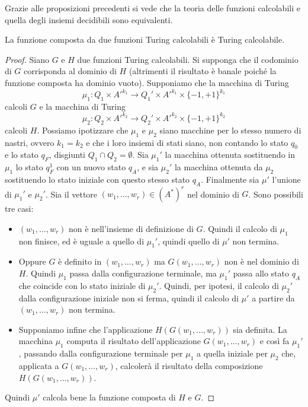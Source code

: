 Grazie alle proposizioni precedenti si vede che la teoria delle funzioni calcolabili e quella degli insiemi decidibili sono equivalenti.



\begin{prop}
La funzione composta da due funzioni Turing calcolabili è Turing calcolabile.
\end{prop}

\begin{proof}
Siano $G$ e $H$ due funzioni Turing calcolabili. Si supponga che il codominio di $G$ corrisponda al dominio di $H$ (altrimenti il risultato è banale poiché la funzione composta ha dominio vuoto). Supponiamo che la macchina di Turing
\[
\mu_1\colon Q_1\times A'^{k_1}\to Q_1'\times A'^{k_1}\times\{-1,+1\}^{k_1}
\]
calcoli $G$ e la macchina di Turing
\[
\mu_2\colon Q_2\times A'^{k_2}\to Q_2'\times A'^{k_2}\times\{-1,+1\}^{k_2}
\]
calcoli $H$. Possiamo ipotizzare che $\mu_1$ e $\mu_2$ siano macchine per lo stesso numero di nastri, ovvero $k_1=k_2$ e che i loro insiemi di stati siano, non contando lo stato $q_0$ e lo stato $q_F$, disgiunti $Q_1\cap Q_2=\emptyset$. Sia $\mu_1'$ la macchina ottenuta sostituendo in $\mu_1$ lo stato $q_F^1$ con un nuovo stato $q_A$, e sia $\mu_2'$ la macchina ottenuta da $\mu_2$ sostituendo lo stato iniziale con questo stesso stato $q_A$. Finalmente sia $\mu'$ l'unione di $\mu_1'$ e $\mu_2'$. Sia il vettore $(w_1,\dots,w_r)\in(A^*)^r$ nel dominio di $G$. Sono possibili tre casi:
\begin{itemize}
    \item $(w_1,\dots,w_r)$ non è nell'insieme di definizione di $G$. Quindi il calcolo di $\mu_1$ non finisce, ed è uguale a quello di $\mu_1'$, quindi quello di $\mu'$ non termina.
    \item Oppure $G$ è definito in $(w_1,\dots,w_r)$ ma $G(w_1,\dots,w_r)$ non è nel dominio di $H$. Quindi $\mu_1$ passa dalla configurazione terminale, ma $\mu_1'$ passa allo stato $q_A$ che coincide con lo stato iniziale di $\mu_2'$. Quindi, per ipotesi, il calcolo di $\mu_2'$ dalla configurazione iniziale non si ferma, quindi il calcolo di $\mu'$ a partire da $(w_1,\dots,w_r)$ non termina.
    \item Supponiamo infine che l'applicazione $H(G(w_1,\dots,w_r))$ sia definita. La macchina $\mu_1$ computa il risultato dell'applicazione $G(w_1,\dots,w_r)$ e così fa $\mu_1'$, passando dalla configurazione terminale per $\mu_1$ a quella iniziale per $\mu_2$ che, applicata a $G(w_1,\dots,w_r)$, calcolerà il risultato della composizione $H(G(w_1,\dots,w_r))$.
\end{itemize}
Quindi $\mu'$ calcola bene la funzione composta di $H$ e $G$.
\end{proof}

